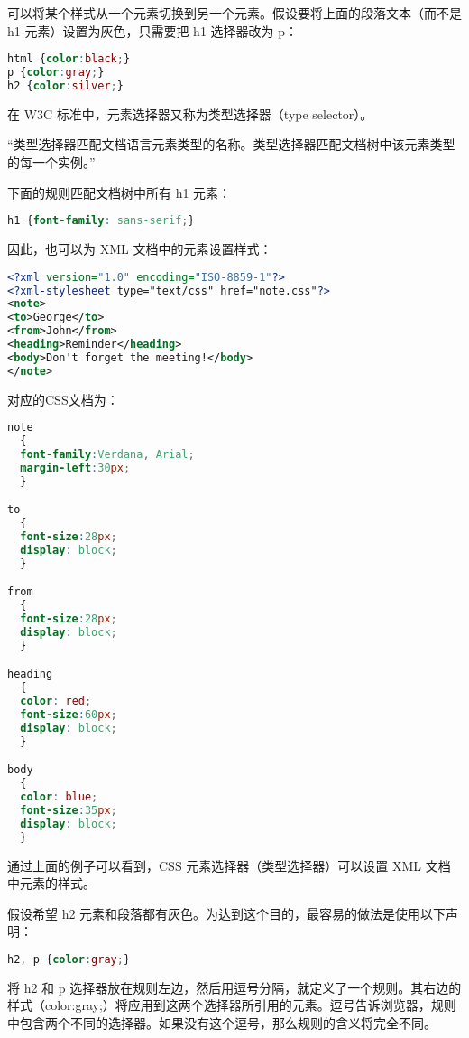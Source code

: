 可以将某个样式从一个元素切换到另一个元素。假设要将上面的段落文本（而不是 h1 元素）设置为灰色，只需要把 h1 选择器改为 p：


\begin{lstlisting}[language=CSS]
html {color:black;}
p {color:gray;}
h2 {color:silver;}
\end{lstlisting}

在 W3C 标准中，元素选择器又称为类型选择器（type selector）。

“类型选择器匹配文档语言元素类型的名称。类型选择器匹配文档树中该元素类型的每一个实例。”


下面的规则匹配文档树中所有 h1 元素：

\begin{lstlisting}[language=CSS]
h1 {font-family: sans-serif;}
\end{lstlisting}

因此，也可以为 XML 文档中的元素设置样式：



\begin{lstlisting}[language=XML]
<?xml version="1.0" encoding="ISO-8859-1"?>
<?xml-stylesheet type="text/css" href="note.css"?>
<note>
<to>George</to>
<from>John</from>
<heading>Reminder</heading>
<body>Don't forget the meeting!</body>
</note>
\end{lstlisting}

对应的CSS文档为：

\begin{lstlisting}[language=CSS]
note
  {
  font-family:Verdana, Arial;
  margin-left:30px;
  }

to
  {
  font-size:28px;
  display: block;
  }

from
  {
  font-size:28px;
  display: block;
  }

heading
  {
  color: red;
  font-size:60px;
  display: block;
  }

body
  {
  color: blue;
  font-size:35px;
  display: block;
  }
\end{lstlisting}

通过上面的例子可以看到，CSS 元素选择器（类型选择器）可以设置 XML 文档中元素的样式。



假设希望 h2 元素和段落都有灰色。为达到这个目的，最容易的做法是使用以下声明：

\begin{lstlisting}[language=CSS]
h2, p {color:gray;}
\end{lstlisting}


将 h2 和 p 选择器放在规则左边，然后用逗号分隔，就定义了一个规则。其右边的样式（color:gray;）将应用到这两个选择器所引用的元素。逗号告诉浏览器，规则中包含两个不同的选择器。如果没有这个逗号，那么规则的含义将完全不同。

